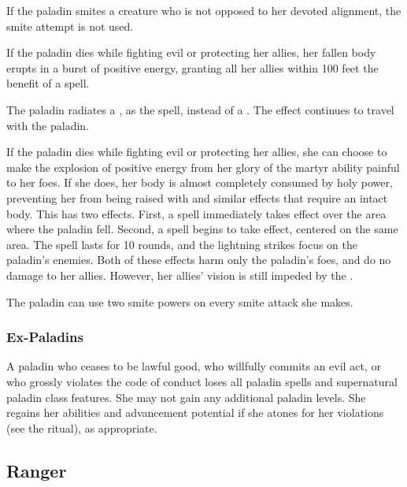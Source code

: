  If the paladin smites a creature who is not opposed to her devoted alignment, the smite attempt is not used.

 If the paladin dies while fighting evil or protecting her allies, her fallen body erupts in a burst of positive energy, granting all her allies within 100 feet the benefit of a  spell.

 The paladin radiates a , as the spell, instead of a . The effect continues to travel with the paladin.

 If the paladin dies while fighting evil or protecting her allies, she can choose to make the explosion of positive energy from her glory of the martyr ability painful to her foes. If she does, her body is almost completely consumed by holy power, preventing her from being raised with  and similar effects that require an intact body. This has two effects. First, a  spell immediately takes effect over the area where the paladin fell. Second, a  spell begins to take effect, centered on the same area. The spell lasts for 10 rounds, and the lightning strikes focus on the paladin's enemies. Both of these effects harm only the paladin's foes, and do no damage to her allies. However, her allies' vision is still impeded by the .

 The paladin can use two smite powers on every smite attack she makes.

\subsubsection{Ex-Paladins}
A paladin who ceases to be lawful good, who willfully commits an evil act, or who grossly violates the code of conduct loses all paladin spells and supernatural paladin class features. She may not gain any additional paladin levels. She regains her abilities and advancement potential if she atones for her violations (see the  ritual), as appropriate.

\subsection{Ranger}

